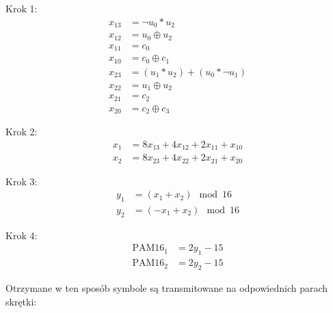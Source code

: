 Krok 1:
\begin{align*}
    x_{13} &= \neg u_0 * u_2 \\
    x_{12} &= u_0 \oplus u_2 \\
    x_{11} &= c_0 \\
    x_{10} &= c_0 \oplus c_1 \\
    x_{23} &= (u_1 * u_2) + (u_0 * \neg u_1) \\
    x_{22} &= u_1 \oplus u_2 \\
    x_{21} &= c_2 \\
    x_{20} &= c_2 \oplus c_3
\end{align*}

Krok 2:
\begin{align*}
    x_1 &= 8x_{13} + 4x_{12} + 2x_{11} + x_{10} \\
    x_2 &= 8x_{23} + 4x_{22} + 2x_{21} + x_{20}
\end{align*}

Krok 3:
\begin{align*}
    y_1 &= (x_1 + x_2) \mod 16 \\
    y_2 &= (-x_1 + x_2) \mod 16
\end{align*}

Krok 4:
\begin{align*}
    \text{PAM16}_1 &= 2y_1 - 15 \\
    \text{PAM16}_2 &= 2y_2 - 15
\end{align*}

Otrzymane w ten sposób symbole są transmitowane na odpowiednich parach skrętki:

\begin{table}[h]
    \centering
\end{table}
